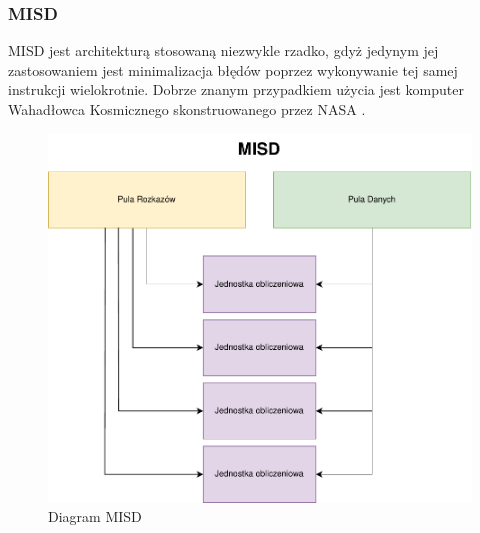 \documentclass[a4paper,12pt]{book} %
\begin{document}
\subsubsection {MISD}
MISD jest architekturą stosowaną niezwykle rzadko, gdyż jedynym jej zastosowaniem jest minimalizacja błędów poprzez wykonywanie tej samej instrukcji wielokrotnie. Dobrze znanym przypadkiem użycia jest komputer Wahadłowca Kosmicznego skonstruowanego przez NASA \cite{SpaceShuttle}.
\begin{figure}[h]
	\centering
	\includegraphics[scale=0.7]{assets/MISD.pdf}
	\caption{Diagram MISD}
	\label{MISD}
\end{figure}
\end{document}
